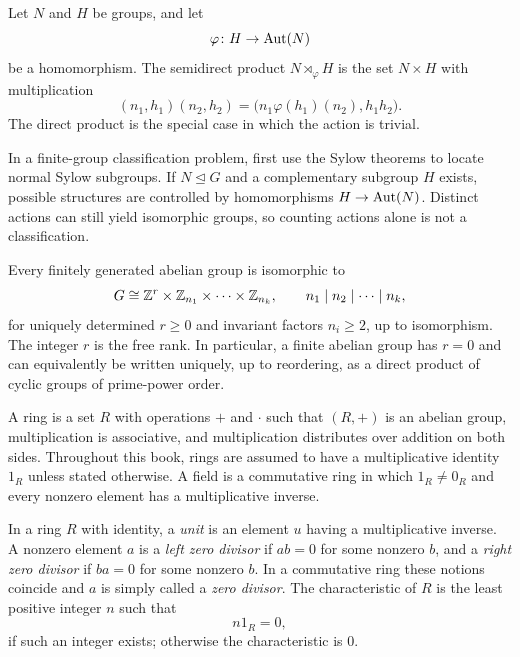     \begin{definition}
        Let $N$ and $H$ be groups, and let
        \[
            \varphi\colon H\to\operatorname{Aut}(N)
        \]
        be a homomorphism. The semidirect product $N\rtimes_\varphi H$ is the
        set $N\times H$ with multiplication
        \[
            (n_1,h_1)(n_2,h_2)
            =
            \bigl(n_1\varphi(h_1)(n_2),h_1h_2\bigr).
        \]
        The direct product is the special case in which the action is trivial.
    \end{definition}

    \begin{strategy}
        In a finite-group classification problem, first use the Sylow theorems
        to locate normal Sylow subgroups. If $N\trianglelefteq G$ and a
        complementary subgroup $H$ exists, possible structures are controlled
        by homomorphisms $H\to\operatorname{Aut}(N)$. Distinct actions can still yield
        isomorphic groups, so counting actions alone is not a classification.
    \end{strategy}

    \begin{theorem}
        Every finitely generated abelian group is isomorphic to
        \[
            G
            \cong
            \mathbb{Z}^r\times
            \mathbb{Z}_{n_1}\times\cdots\times\mathbb{Z}_{n_k},
            \qquad
            n_1\mid n_2\mid\cdots\mid n_k,
        \]
        for uniquely determined $r\geq0$ and invariant factors
        $n_i\geq2$, up to isomorphism. The integer $r$ is the free rank.
        In particular, a finite abelian group has $r=0$ and can equivalently be
        written uniquely, up to reordering, as a direct product of cyclic groups
        of prime-power order.
    \end{theorem}

    \begin{definition}
        A ring is a set $R$ with operations $+$ and $\cdot$ such that
        $(R,+)$ is an abelian group, multiplication is associative, and
        multiplication distributes over addition on both sides. Throughout this
        book, rings are assumed to have a multiplicative identity $1_R$ unless
        stated otherwise. A field is a commutative ring in which $1_R\neq0_R$
        and every nonzero element has a multiplicative inverse.
    \end{definition}


    \begin{definition}
        In a ring $R$ with identity, a \emph{unit} is an element $u$ having a
        multiplicative inverse. A nonzero element $a$ is a \emph{left zero
        divisor} if $ab=0$ for some nonzero $b$, and a \emph{right zero divisor}
        if $ba=0$ for some nonzero $b$. In a commutative ring these notions
        coincide and $a$ is simply called a \emph{zero divisor}. The
        characteristic of $R$ is the least
        positive integer $n$ such that
        \[
            n1_R=0,
        \]
        if such an integer exists; otherwise the characteristic is $0$.
    \end{definition}

